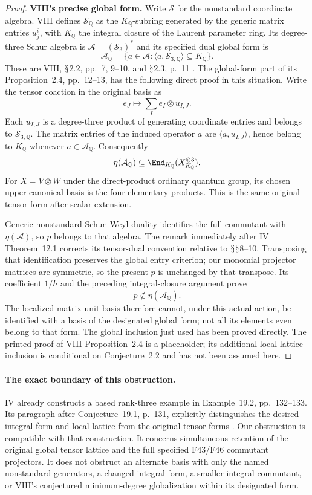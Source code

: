 \documentclass[11pt,a4paper]{article}
\newcommand{\Q}{\mathbb Q}\newcommand{\Z}{\mathbb Z}\newcommand{\C}{\mathbb C}\newcommand{\N}{\mathbb N}\newcommand{\F}{\mathbb F}
\renewcommand{\S}{\ensuremath{\mathsection}}
\newcommand{\fid}[1]{\textsf{#1}}\newcommand{\gate}[1]{\textsf{#1}}
\theoremstyle{named}\newtheorem{finding}{Finding}[section]
\theoremstyle{definition}\newtheorem{definition}[finding]{Definition}
\theoremstyle{remark}\newtheorem{remark}[finding]{Remark}
\begin{document}
\begin{proof}
\par\smallskip\noindent\textbf{VIII's precise global form.}\quad
Write $\mathcal S$ for the nonstandard coordinate algebra.
VIII defines $\mathcal S_{\Q}$ as the $K_{\Q}$-subring generated
by the generic matrix entries $u^i_j$, with $K_{\Q}$ the
integral closure of the Laurent parameter ring.
Its degree-three Schur algebra is
$\mathcal A=(\mathcal S_3)^*$ and its specified dual global form is
\[
 \mathcal A_{\Q}
 =\{a\in\mathcal A:
       \langle a,\mathcal S_{3,\Q}\rangle\subseteq K_{\Q}\}.
\]
These are VIII, \S2.2, pp.~7, 9--10, and \S2.3, p.~11
\cite{VIII}.
The global-form part of its Proposition~2.4, pp.~12--13,
has the following direct proof in this situation.
Write the tensor coaction in the original basis as
\[
 e_J\longmapsto\sum_I e_I\otimes u_{I,J}.
\]
Each $u_{I,J}$ is a degree-three product of generating
coordinate entries and belongs to $\mathcal S_{3,\Q}$.
The matrix entries of the induced operator $a$ are
$\langle a,u_{I,J}\rangle$, hence belong to $K_{\Q}$ whenever
$a\in\mathcal A_{\Q}$. Consequently
\[
 \eta(\mathcal A_{\Q})
 \subseteq\End_{K_{\Q}}(X_{K_{\Q}}^{\otimes3}).
\]
For $X=V\otimes W$ under the direct-product ordinary quantum
group, its chosen upper canonical basis is the four elementary
products. This is the same original tensor form after scalar
extension.

Generic nonstandard Schur--Weyl duality identifies the full
commutant with $\eta(\mathcal A)$, so $p$ belongs to that algebra.
The remark immediately after IV Theorem~12.1 corrects its
tensor-dual convention relative to \S\S8--10.
Transposing that identification preserves the global entry
criterion; our monomial projector matrices are symmetric,
so the present $p$ is unchanged by that transpose.
Its coefficient $1/h$ and the preceding integral-closure
argument prove
\[
 p\notin\eta(\mathcal A_{\Q}).
\]
The localized matrix-unit basis therefore cannot, under this
actual action, be identified with a basis of the designated
global form; not all its elements even belong to that form.
The global inclusion just used has been proved directly.
The printed proof of VIII Proposition~2.4 is a placeholder;
its additional local-lattice inclusion is conditional on
Conjecture~2.2 and has not been assumed here.
\end{proof}

\paragraph{The exact boundary of this obstruction.}
IV already constructs a based rank-three example in
Example~19.2, pp.~132--133. Its paragraph after Conjecture~19.1,
p.~131, explicitly distinguishes the desired integral form and
local lattice from the original tensor forms \cite{IV}.
Our obstruction is compatible with that construction.
It concerns simultaneous retention of the original global tensor
lattice and the full specified \fid{F43}/\fid{F46} commutant
projectors. It does not obstruct an alternate basis with only
the named nonstandard generators, a changed integral form, a
smaller integral commutant, or VIII's conjectured minimum-degree
globalization within its designated form.
\end{document}
